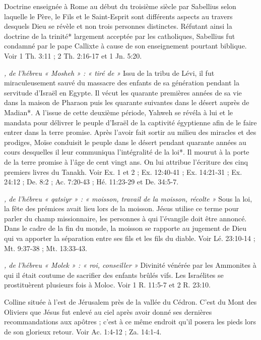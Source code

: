 \begin{multicols}{2}
{\textit{}\newline
Doctrine enseignée à Rome au début du troisième siècle par Sabellius selon laquelle le Père, le Fils et le Saint-Esprit sont différents aspects au travers desquels Dieu se révèle et non trois personnes distinctes. Réfutant ainsi la doctrine de la trinité* largement acceptée par les catholiques, Sabellius fut condamné par le pape Callixte à cause de son enseignement pourtant biblique. Voir 1 Th. 3:11 ; 2 Th. 2:16-17 et 1 Jn. 5:20.

\textit{, de l'hébreu « Mosheh » : « tiré de »}\newline
Issu de la tribu de Lévi, il fut miraculeusement sauvé du massacre des enfants de sa génération pendant la servitude d'Israël en Egypte. Il vécut les quarante premières années de sa vie dans la maison de Pharaon puis les quarante suivantes dans le désert auprès de Madian*. A l'issue de cette deuxième période, Yahweh se révéla à lui et le mandata pour délivrer le peuple d'Israël de la captivité égyptienne afin de le faire entrer dans la terre promise. Après l'avoir fait sortir au milieu des miracles et des prodiges, Moïse conduisit le peuple dans le désert pendant quarante années au cours desquelles il leur communiqua l'intégralité de la loi*. Il mourut à la porte de la terre promise à l'âge de cent vingt ans. On lui attribue l'écriture des cinq premiers livres du Tanakh. Voir Ex. 1 et 2 ; Ex. 12:40-41 ; Ex. 14:21-31 ; Ex. 24:12 ; De. 8:2 ; Ac. 7:20-43 ; Hé. 11:23-29 et De. 34:5-7.

\textit{, de l'hébreu « qatsiyr » : « moisson, travail de la moisson, récolte »}\newline
Sous la loi, la fête des prémices avait lieu lors de la moisson. Jésus utilise ce terme pour parler du champ missionnaire, les personnes à qui l'évangile doit être annoncé. Dans le cadre de la fin du monde, la moisson se rapporte au jugement de Dieu qui va apporter la séparation entre ses fils et les fils du diable. Voir Lé. 23:10-14 ; Mt. 9:37-38 ; Mt. 13:33-43.

\textit{, de l'hébreu « Molek » : « roi, conseiller »}\newline
Divinité vénérée par les Ammonites à qui il était coutume de sacrifier des enfants brûlés vifs. Les Israélites se prostituèrent plusieurs fois à Moloc. Voir 1 R. 11:5-7 et 2 R. 23:10.

\textit{}\newline
Colline située à l'est de Jérusalem près de la vallée du Cédron. C'est du Mont des Oliviers que Jésus fut enlevé au ciel après avoir donné ses dernières recommandations aux apôtres ; c'est à ce même endroit qu'il posera les pieds lors de son glorieux retour. Voir Ac. 1:4-12 ; Za. 14:1-4.

}
\end{multicols}
